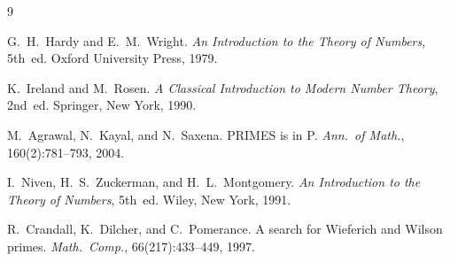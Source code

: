 \documentclass[12pt,a4paper]{amsart}
\theoremstyle{definition}
\begin{document}
\begin{thebibliography}{9}

G.~H.~Hardy and E.~M.~Wright.
\newblock \emph{An Introduction to the Theory of Numbers}, 5th~ed.
\newblock Oxford University Press, 1979.

K.~Ireland and M.~Rosen.
\newblock \emph{A Classical Introduction to Modern Number Theory}, 2nd~ed.
\newblock Springer, New York, 1990.

M.~Agrawal, N.~Kayal, and N.~Saxena.
\newblock PRIMES is in P.
\newblock \emph{Ann.\ of Math.}, 160(2):781--793, 2004.

I.~Niven, H.~S.~Zuckerman, and H.~L.~Montgomery.
\newblock \emph{An Introduction to the Theory of Numbers}, 5th~ed.
\newblock Wiley, New York, 1991.

R.~Crandall, K.~Dilcher, and C.~Pomerance.
\newblock A search for Wieferich and Wilson primes.
\newblock \emph{Math.\ Comp.}, 66(217):433--449, 1997.

\end{thebibliography}
\end{document}

